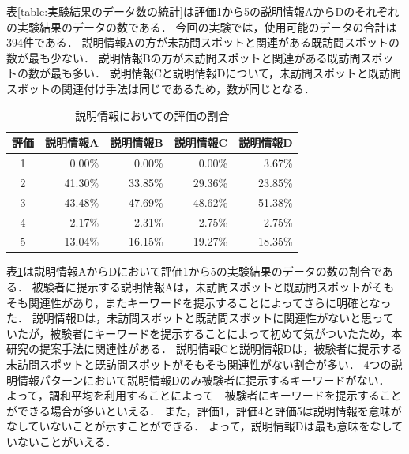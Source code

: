 \documentclass{deimj}
\begin{document}
表\ref{table:実験結果のデータ数の統計}は評価1から5の説明情報AからDのそれぞれの実験結果のデータの数である．
今回の実験では，使用可能のデータの合計は394件である．
説明情報Aの方が未訪問スポットと関連がある既訪問スポットの数が最も少ない．
説明情報Bの方が未訪問スポットと関連がある既訪問スポットの数が最も多い．
説明情報Cと説明情報Dについて，未訪問スポットと既訪問スポットの関連付け手法は同じであるため，数が同じとなる．

\begin{table}[t]
  \caption{説明情報においての評価の割合}
  \label{table:説明情報においての評価の割合}
  \centering
  \begin{tabular}{c|r|r|r|r}
  \hline
  評価 & \multicolumn{1}{c|}{説明情報A} & \multicolumn{1}{c|}{説明情報B} & \multicolumn{1}{c|}{説明情報C} & \multicolumn{1}{c}{説明情報D} \\ \hline
  1  & 0.00\%                     & 0.00\%                     & 0.00\%                     & 3.67\%                    \\
  2  & 41.30\%                    & 33.85\%                    & 29.36\%                    & 23.85\%                   \\
  3  & 43.48\%                    & 47.69\%                    & 48.62\%                    & 51.38\%                   \\
  4  & 2.17\%                     & 2.31\%                     & 2.75\%                     & 2.75\%                    \\
  5  & 13.04\%                    & 16.15\%                    & 19.27\%                    & 18.35\%                   \\ \hline
  \end{tabular}
\end{table}

表\ref{table:説明情報においての評価の割合}は説明情報AからDにおいて評価1から5の実験結果のデータの数の割合である．
被験者に提示する説明情報Aは，未訪問スポットと既訪問スポットがそもそも関連性があり，またキーワードを提示することによってさらに明確となった．
説明情報Dは，未訪問スポットと既訪問スポットに関連性がないと思っていたが，被験者にキーワードを提示することによって初めて気がついたため，本研究の提案手法に関連性がある．
説明情報Cと説明情報Dは，被験者に提示する未訪問スポットと既訪問スポットがそもそも関連性がない割合が多い．
4つの説明情報パターンにおいて説明情報Dのみ被験者に提示するキーワードがない．
よって，調和平均を利用することによって　被験者にキーワードを提示することができる場合が多いといえる．
また，評価1，評価4と評価5は説明情報を意味がなしていないことが示すことができる．
よって，説明情報Dは最も意味をなしていないことがいえる．
\end{document}
